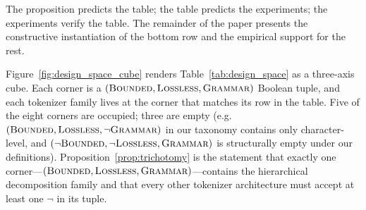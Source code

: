\documentclass[11pt]{article}
\begin{document}
The proposition predicts the table; the table predicts the experiments; the experiments verify the table. The remainder of the paper presents the constructive instantiation of the bottom row and the empirical support for the rest.

Figure~\ref{fig:design_space_cube} renders Table~\ref{tab:design_space} as a three-axis cube. Each corner is a $(\textsc{Bounded}, \textsc{Lossless}, \textsc{Grammar})$ Boolean tuple, and each tokenizer family lives at the corner that matches its row in the table. Five of the eight corners are occupied; three are empty (e.g.\ $(\textsc{Bounded},\textsc{Lossless},\neg\textsc{Grammar})$ in our taxonomy contains only character-level, and $(\neg\textsc{Bounded},\neg\textsc{Lossless},\textsc{Grammar})$ is structurally empty under our definitions). Proposition~\ref{prop:trichotomy} is the statement that exactly one corner---$(\textsc{Bounded},\textsc{Lossless},\textsc{Grammar})$---contains the hierarchical decomposition family and that every other tokenizer architecture must accept at least one $\neg$ in its tuple.
\end{document}
